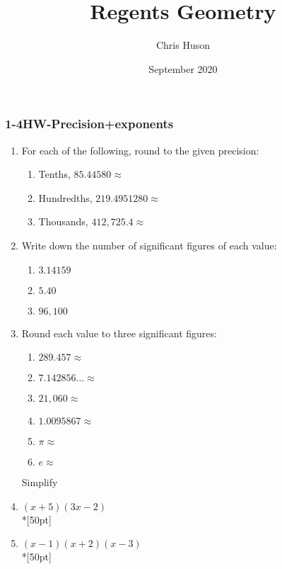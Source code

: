\documentclass[12pt, twoside]{article}
\title{Regents Geometry}
\author{Chris Huson}
\date{September 2020}
\begin{document}
\subsubsection*{1-4HW-Precision+exponents}
\begin{enumerate}
\item For each of the following, round to the given precision:
  \begin{enumerate}
    \item Tenths, $85.44580 \approx$ \vspace{0.5cm}
    \item Hundredths, $219.4951280 \approx$ \vspace{0.5cm}
    \item Thousands, $412,725.4 \approx$ \vspace{0.5cm}
  \end{enumerate}
\item Write down the number of significant figures of each value:
  \begin{enumerate}
    \item $3.14159$ \vspace{0.5cm}
    \item $5.40$ \vspace{0.5cm}
    \item $96,100$ \vspace{0.5cm}
  \end{enumerate}
\item Round each value to three significant figures:
  \begin{enumerate}
    \item $289.457 \approx$ \vspace{0.75cm}
    \item $7.142856\ldots \approx$ \vspace{0.75cm}
    \item $21,060 \approx$ \vspace{0.75cm}
    \item $1.0095867 \approx$ \vspace{0.75cm}
    \item $\pi \approx$ \vspace{0.75cm}
    \item $e \approx$
  \end{enumerate}
  
\newpage

Simplify

\item $(x +5)(3x-2)$\\*[50pt]
\item $(x -1)(x+2)(x-3)$\\*[50pt]


\end{enumerate}
\end{document}

